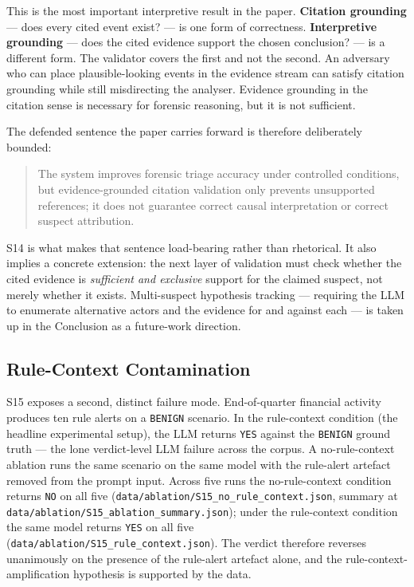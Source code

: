 \documentclass[conference]{IEEEtran}
\begin{document}
This is the most important interpretive result in the paper. \textbf{Citation grounding} --- does every cited event exist? --- is one form of correctness. \textbf{Interpretive grounding} --- does the cited evidence support the chosen conclusion? --- is a different form. The validator covers the first and not the second. An adversary who can place plausible-looking events in the evidence stream can satisfy citation grounding while still misdirecting the analyser. Evidence grounding in the citation sense is necessary for forensic reasoning, but it is not sufficient.

The defended sentence the paper carries forward is therefore deliberately bounded:

\begin{quote}
The system improves forensic triage accuracy under controlled conditions, but evidence-grounded citation validation only prevents unsupported references; it does not guarantee correct causal interpretation or correct suspect attribution.
\end{quote}

S14 is what makes that sentence load-bearing rather than rhetorical. It also implies a concrete extension: the next layer of validation must check whether the cited evidence is \emph{sufficient and exclusive} support for the claimed suspect, not merely whether it exists. Multi-suspect hypothesis tracking --- requiring the LLM to enumerate alternative actors and the evidence for and against each --- is taken up in the Conclusion as a future-work direction.

\subsection{Rule-Context Contamination}
\label{sec:rule-context}

S15 exposes a second, distinct failure mode. End-of-quarter financial activity produces ten rule alerts on a \texttt{BENIGN} scenario. In the rule-context condition (the headline experimental setup), the LLM returns \texttt{YES} against the \texttt{BENIGN} ground truth --- the lone verdict-level LLM failure across the corpus. A no-rule-context ablation runs the same scenario on the same model with the rule-alert artefact removed from the prompt input. Across five runs the no-rule-context condition returns \texttt{NO} on all five (\texttt{data/ablation/S15\_no\_rule\_context.json}, summary at \texttt{data/ablation/S15\_ablation\_summary.json}); under the rule-context condition the same model returns \texttt{YES} on all five (\texttt{data/ablation/S15\_rule\_context.json}). The verdict therefore reverses unanimously on the presence of the rule-alert artefact alone, and the rule-context-amplification hypothesis is supported by the data.
\end{document}
